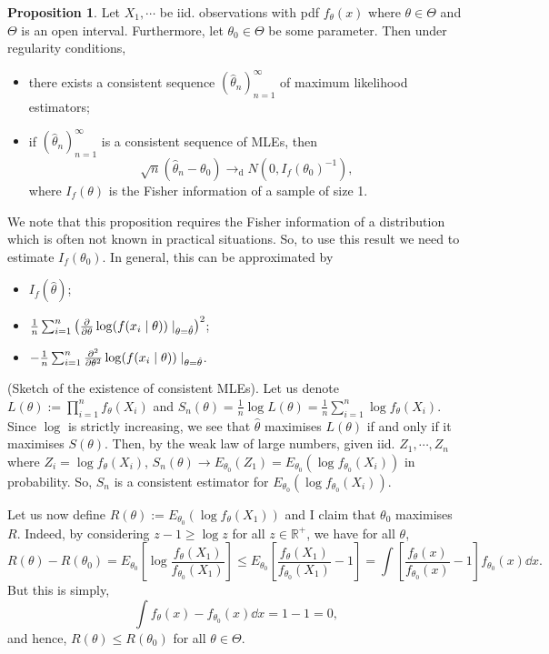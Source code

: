 \documentclass[
]{article}
\theoremstyle{definition}
\newtheorem{prop}{Proposition}
\theoremstyle{definition}
\begin{document}
\begin{prop}
  Let \(X_1, \cdots\) be iid. observations with pdf \(f_\theta(x)\) where 
  \(\theta \in \Theta\) and \(\Theta\) is an open interval. Furthermore, let 
  \(\theta_0 \in \Theta\) be some parameter. Then under regularity conditions, 
  \begin{itemize}
    \item there exists a consistent sequence \((\hat{\theta}_n)_{n = 1}^\infty\) 
      of maximum likelihood estimators;
    \item if \((\hat{\theta}_n)_{n = 1}^\infty\) is a consistent sequence of MLEs, 
    then 
    \[\sqrt{n}(\hat{\theta}_n - \theta_0) \to_\text{d} N(0, I_f(\theta_0)^{-1}),\]
    where \(I_f(\theta)\) is the Fisher information of a sample of size 1.
  \end{itemize}
\end{prop}

We note that this proposition requires the Fisher information of a
distribution which is often not known in practical situations. So, to
use this result we need to estimate \(I_f(\theta_0)\). In general, this
can be approximated by

\begin{itemize}
  \item \(I_f(\hat{\theta})\);
  \item \(\frac{1}{n}\sum_{i = 1}^n \left(\pdv{\theta} 
    \log(f(x_i \mid \theta))\mid_{\theta = \hat{\theta}}\right)^2\);
  \item \(- \frac{1}{n}\sum_{i = 1}^n \pdv[2]{\theta} 
    \log(f(x_i \mid \theta))\mid_{\theta = \hat{\theta}}\).
\end{itemize}

\proof (Sketch of the existence of consistent MLEs). Let us denote
\(L(\theta) := \prod_{i = 1}^n f_\theta(X_i)\) and
\(S_n(\theta) = \frac{1}{n} \log L(\theta) = \frac{1}{n} \sum_{i = 1}^n \log f_\theta(X_i)\).
Since \(\log\) is strictly increasing, we see that \(\hat{\theta}\)
maximises \(L(\theta)\) if and only if it maximises \(S(\theta)\). Then,
by the weak law of large numbers, given iid. \(Z_1, \cdots, Z_n\) where
\(Z_i = \log f_{\theta}(X_i)\),
\(S_n(\theta) \to E_{\theta_0}(Z_1) = E_{\theta_0}(\log f_{\theta_0}(X_i))\)
in probability. So, \(S_n\) is a consistent estimator for
\(E_{\theta_0}(\log f_{\theta_0}(X_i))\).

Let us now define \(R(\theta) := E_{\theta_0}(\log f_\theta (X_1))\) and
I claim that \(\theta_0\) maximises \(R\). Indeed, by considering
\(z - 1 \ge \log z\) for all \(z \in \mathbb{R}^+\), we have for all
\(\theta\), \[R(\theta) - R(\theta_0) = 
    E_{\theta_0} \left[\log \frac{f_\theta(X_1)}{f_{\theta_0}(X_1)}\right]
    \le E_{\theta_0} \left[\frac{f_\theta(X_1)}{f_{\theta_0}(X_1)} - 1\right]
    = \int \left[\frac{f_\theta(x)}{f_{\theta_0}(x)} - 1\right] f_{\theta_0}(x) \dd x.\]
But this is simply,
\[\int f_{\theta}(x) - f_{\theta_0}(x) \dd x = 1 - 1 = 0,\] and hence,
\(R(\theta) \le R(\theta_0)\) for all \(\theta \in \Theta\).
\end{document}
